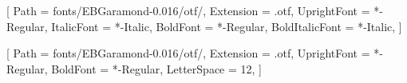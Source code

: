 %
%
%
%

\newfontfamily{}[
  Path = fonts/EBGaramond-0.016/otf/, Extension = .otf,
  UprightFont = *-Regular, ItalicFont = *-Italic,
  BoldFont = *-Regular, BoldItalicFont = *-Italic,
]

%
\newfontfamily{}[
  Path = fonts/EBGaramond-0.016/otf/, Extension = .otf,
  UprightFont = *-Regular, BoldFont = *-Regular,
  LetterSpace = 12,
]
\newcommand{\displaycaps}[1]{{\mcmDisplayFontLS\MakeUppercase{#1}}}

